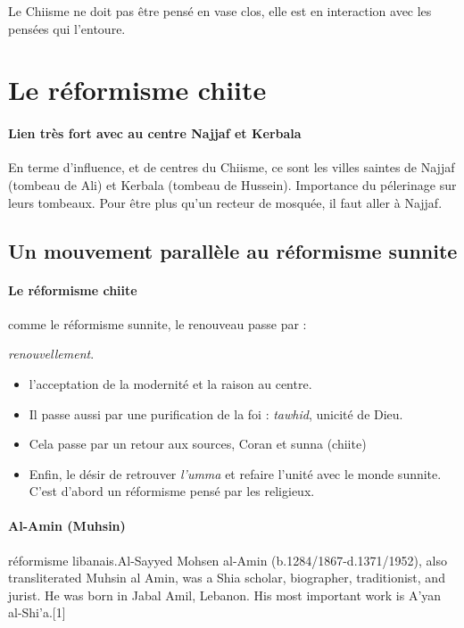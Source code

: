 Le Chiisme ne doit pas être pensé en vase clos, elle est en interaction avec les pensées qui l'entoure.

\section{Le réformisme chiite}
\label{le-ruxe9formisme-chiite}

  \paragraph{Lien très fort avec au centre Najjaf et Kerbala} En terme d'influence, et de centres du Chiisme, ce sont les villes saintes de Najjaf (tombeau de Ali) et Kerbala (tombeau de Hussein). Importance du pélerinage sur leurs tombeaux. 
  Pour être plus qu'un recteur de mosquée, il faut aller à Najjaf. 
  
  
     \subsection{Un mouvement parallèle au réformisme sunnite}

  \paragraph{Le réformisme chiite} comme le réformisme sunnite, le renouveau passe par :
  \begin{Def}[tajdid] 
\emph{renouvellement}.
\end{Def}

  \begin{itemize}
      \item   l'acceptation de la modernité et la raison au centre.
      \item   Il passe aussi par une purification de la foi : \emph{tawhid}, unicité de Dieu.
      \item Cela passe par un retour aux sources, Coran et sunna (chiite)
      \item Enfin, le désir de retrouver \emph{l'umma} et refaire l'unité avec le monde sunnite.
C'est d'abord un réformisme pensé par les religieux.
  \end{itemize}

\paragraph{Al-Amin (Muhsin)} réformisme libanais.Al-Sayyed Mohsen al-Amin (b.1284/1867-d.1371/1952), also transliterated Muhsin al Amin, was a Shia scholar, biographer, traditionist, and jurist. He was born in Jabal Amil, Lebanon. His most important work is A'yan al-Shi'a.[1] 

